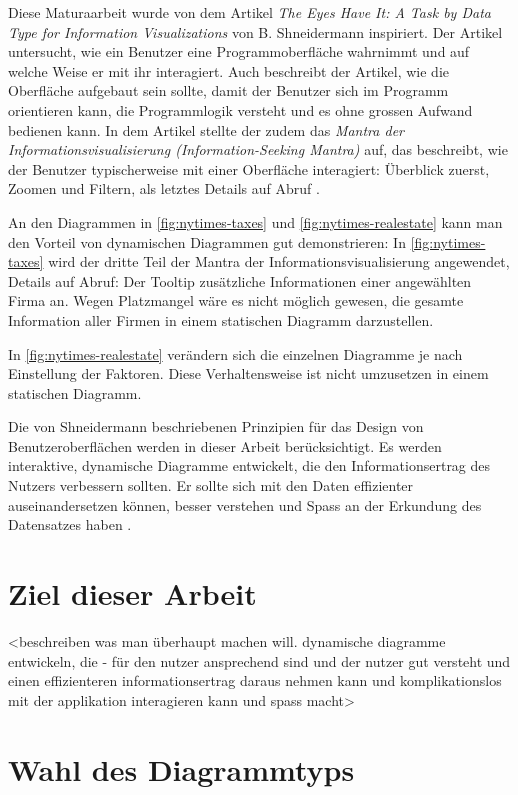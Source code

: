 Diese Maturaarbeit wurde von dem Artikel \textit{The Eyes Have It: A Task by Data Type for Information Visualizations} von B. Shneidermann \cite{shneiderman} inspiriert. Der Artikel untersucht, wie ein Benutzer eine Programmoberfläche wahrnimmt und auf welche Weise er mit ihr interagiert. Auch beschreibt der Artikel, wie die Oberfläche aufgebaut sein sollte, damit der Benutzer sich im Programm orientieren kann, die Programmlogik versteht und es ohne grossen Aufwand bedienen kann. In dem Artikel stellte der zudem das \textit{Mantra der Informationsvisualisierung (Information-Seeking Mantra)} auf, das beschreibt, wie der Benutzer typischerweise mit einer Oberfläche interagiert: Überblick zuerst, Zoomen und Filtern, als letztes Details auf Abruf \cite{shneiderman}.

An den Diagrammen in \ref{fig:nytimes-taxes} und \ref{fig:nytimes-realestate} kann man den Vorteil von dynamischen Diagrammen gut demonstrieren: In \ref{fig:nytimes-taxes} wird der dritte Teil der Mantra der Informationsvisualisierung angewendet, Details auf Abruf: Der Tooltip zusätzliche Informationen einer angewählten Firma an. Wegen Platzmangel wäre es nicht möglich gewesen, die gesamte Information aller Firmen in einem statischen Diagramm darzustellen.

In \ref{fig:nytimes-realestate} verändern sich die einzelnen Diagramme je nach Einstellung der Faktoren. Diese Verhaltensweise ist nicht umzusetzen in einem statischen Diagramm.

Die von Shneidermann beschriebenen Prinzipien für das Design von Benutzeroberflächen werden in dieser Arbeit berücksichtigt. Es werden interaktive, dynamische Diagramme entwickelt, die den Informationsertrag des Nutzers verbessern sollten. Er sollte sich mit den Daten effizienter auseinandersetzen können, besser verstehen und Spass an der Erkundung des Datensatzes haben \cite{shneiderman}.

\section{Ziel dieser Arbeit}

<beschreiben was man überhaupt machen will. dynamische diagramme entwickeln, die - für den nutzer ansprechend sind und der nutzer gut versteht und einen effizienteren informationsertrag daraus nehmen kann und komplikationslos mit der applikation interagieren kann und spass macht>

\section{Wahl des Diagrammtyps}

